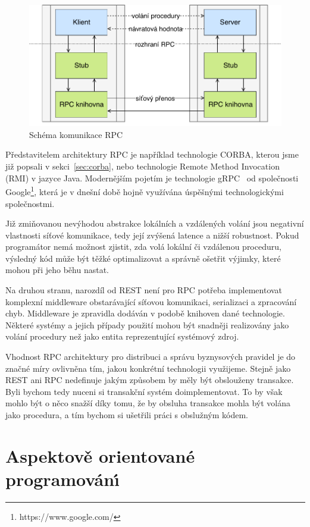 \begin{figure}[t]
    \centering
    \includegraphics[keepaspectratio=true, width=0.7\linewidth]{figures/rpc.pdf}
    \caption{Schéma komunikace \gls{RPC}}
    \label{fig:rpc}
\end{figure}

Představitelem architektury \gls{RPC} je například technologie \gls{CORBA},
kterou jsme již popsali v sekci~\ref{sec:corba}, nebo technologie Remote Method Invocation (\gls{RMI})
v jazyce Java. Modernějším pojetím je technologie gRPC~\cite{grpcio}
od společnosti Google\footnote{https://www.google.com/},
která je v dnešní době hojně využívána úspěšnými technologickými společnostmi.

Již zmiňovanou nevýhodou abstrakce lokálních a vzdálených volání jsou
negativní vlastnosti síťové komunikace, tedy její zvýšená latence
a nižší robustnost. Pokud programátor nemá možnost zjistit, zda volá
lokální či vzdálenou proceduru, výsledný kód může být těžké optimalizovat
a správně ošetřit výjimky, které mohou při jeho běhu nastat.

Na druhou stranu, narozdíl od \gls{REST} není pro \gls{RPC} potřeba
implementovat komplexní middleware obstarávající síťovou komunikaci,
serializaci a zpracování chyb. Middleware je zpravidla dodáván v podobě knihoven
dané technologie. Některé systémy a jejich případy použití mohou být snadněji
realizovány jako volání procedury než jako entita reprezentující systémový zdroj.

Vhodnost \gls{RPC} architektury pro distribuci a správu byznysových pravidel je do značné
míry ovlivněna tím, jakou konkrétní technologii využijeme. Stejně jako \gls{REST}
ani \gls{RPC} nedefinuje jakým způsobem by měly být obslouženy transakce. Byli bychom tedy
nuceni si transakční systém doimplementovat. To by však mohlo být o něco snažší díky tomu,
že by obsluha transakce mohla být volána jako procedura, a tím bychom si ušetřili práci
s obslužným kódem.

\section{Aspektově orientované programován\'{\i}}\label{sec:aop}

